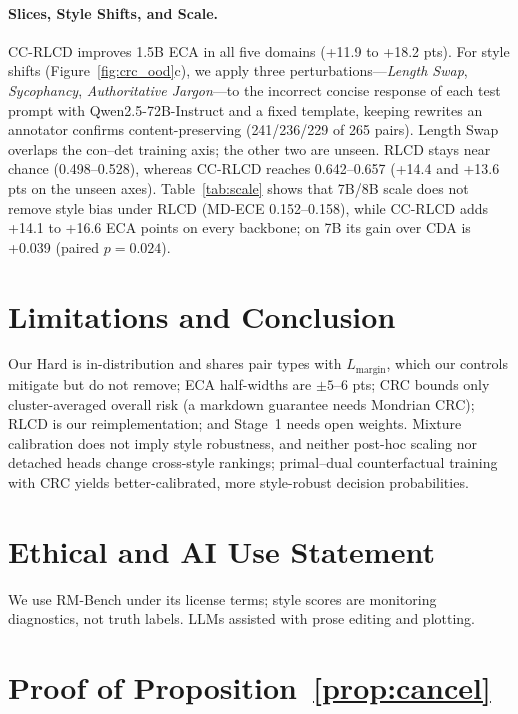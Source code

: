 \documentclass[letterpaper]{article} %
\begin{document}
\paragraph{Slices, Style Shifts, and Scale.}
CC-RLCD improves 1.5B ECA in all five domains (+11.9 to +18.2 pts). For style shifts (Figure~\ref{fig:crc_ood}c), we apply three \citet{bharadwaj2026flattery} perturbations---\emph{Length Swap}, \emph{Sycophancy}, \emph{Authoritative Jargon}---to the incorrect concise response of each test prompt with Qwen2.5-72B-Instruct and a fixed template, keeping rewrites an annotator confirms content-preserving (241/236/229 of 265 pairs). Length Swap overlaps the con--det training axis; the other two are unseen. RLCD stays near chance (0.498--0.528), whereas CC-RLCD reaches 0.642--0.657 (+14.4 and +13.6 pts on the unseen axes). Table~\ref{tab:scale} shows that 7B/8B scale does not remove style bias under RLCD (MD-ECE 0.152--0.158), while CC-RLCD adds +14.1 to +16.6 ECA points on every backbone; on 7B its gain over CDA is +0.039 (paired $p{=}0.024$).

\section{Limitations and Conclusion}

Our Hard is in-distribution and shares pair types with $L_{\mathrm{margin}}$, which our controls mitigate but do not remove; ECA half-widths are $\pm 5$--$6$ pts; CRC bounds only cluster-averaged overall risk (a markdown guarantee needs Mondrian CRC); RLCD is our reimplementation; and Stage~1 needs open weights. Mixture calibration does not imply style robustness, and neither post-hoc scaling nor detached heads change cross-style rankings; primal--dual counterfactual training with CRC yields better-calibrated, more style-robust decision probabilities.

\section*{Ethical and AI Use Statement}

We use RM-Bench under its license terms; style scores are monitoring diagnostics, not truth labels. LLMs assisted with prose editing and plotting.



\appendix
\section{Proof of Proposition~\ref{prop:cancel}}
\label{app:proof}
\end{document}
